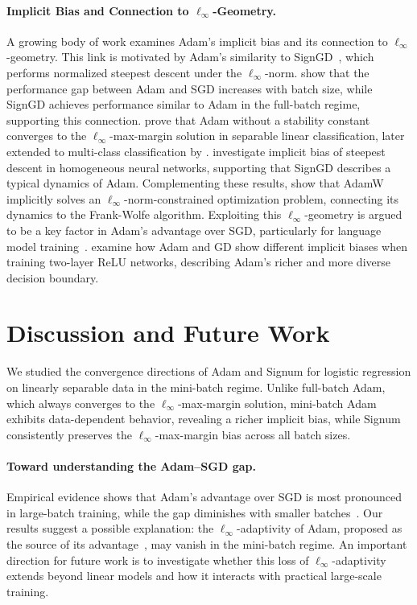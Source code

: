 \documentclass{article} %
\theoremstyle{plain}
\theoremstyle{definition}
\theoremstyle{remark}
\begin{document}
\vspace{-3pt}
\paragraph{Implicit Bias and Connection to $\ell_\infty$-Geometry.}
A growing body of work examines Adam’s implicit bias and its connection to $\ell_\infty$-geometry. This link is motivated by Adam’s similarity to SignGD~\citep{balles2018dissecting, bernstein2018sign}, which performs normalized steepest descent under the $\ell_\infty$-norm. \citet{kunstner2023noise} show that the performance gap between Adam and SGD increases with batch size, while SignGD achieves performance similar to Adam in the full-batch regime, supporting this connection. \citet{zhang2024the} prove that Adam without a stability constant converges to the $\ell_\infty$-max-margin solution in separable linear classification, later extended to multi-class classification by \citet{fan2025implicitbiasspectraldescent}. \citet{tsilivis2025flavors} investigate implicit bias of steepest descent in homogeneous neural networks, supporting that SignGD describes a typical dynamics of Adam. Complementing these results, \citet{xie2024implicit} show that AdamW implicitly solves an $\ell_\infty$-norm-constrained optimization problem, connecting its dynamics to the Frank-Wolfe algorithm. Exploiting this $\ell_\infty$-geometry is argued to be a key factor in Adam’s advantage over SGD, particularly for language model training~\citep{xie2025adam}. \citet{vasudeva2025the} examine how Adam and GD show different implicit biases when training two-layer ReLU networks, describing Adam's richer and more diverse decision boundary.

\section{Discussion and Future Work}

We studied the convergence directions of Adam and Signum for logistic regression on linearly separable data in the mini-batch regime. Unlike full-batch Adam, which always converges to the $\ell_\infty$-max-margin solution, mini-batch Adam exhibits data-dependent behavior, revealing a richer implicit bias, while Signum consistently preserves the $\ell_\infty$-max-margin bias across all batch sizes. 

\vspace{-3pt}
\paragraph{Toward understanding the Adam--SGD gap.}
Empirical evidence shows that Adam’s advantage over SGD is most pronounced in large-batch training, while the gap diminishes with smaller batches~\citep{kunstner2023noise,sreckovic2025your,marek2025small}. Our results suggest a possible explanation: the $\ell_\infty$-adaptivity of Adam, proposed as the source of its advantage~\citep{xie2025adam}, may vanish in the mini-batch regime. An important direction for future work is to investigate whether this loss of $\ell_\infty$-adaptivity extends beyond linear models and how it interacts with practical large-scale training.
\end{document}
